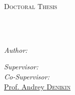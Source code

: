 \documentclass[
12pt, %
oneside, %
english, %
onehalfspacing, %
onehalfspacing, %
headsepline, %
]{MastersDoctoralThesis} %
\author{Bakytzhan \textsc{Urazbekov}} %
\begin{document}
\frontmatter %

\pagestyle{plain} %


\begin{titlepage}
\begin{center}

{\scshape\LARGE \univname\par}\vspace{1.5cm} %
\textsc{\Large Doctoral Thesis}\\[0.5cm] %

\HRule \\[0.4cm] %
{\huge \bfseries \ttitle\par}\vspace{0.4cm} %
\HRule \\[1.5cm] %
 
\begin{minipage}[t]{0.4\textwidth}
\begin{flushleft} \large
\emph{Author:}\\
\href{https://www.researchgate.net/profile/Bakytzhan_Urazbekov}{\authorname} %
\end{flushleft}
\end{minipage}
\begin{minipage}[t]{0.4\textwidth}
\begin{flushright} \large
\emph{Supervisor:} \\
\href{https://www.researchgate.net/profile/Nunzio_Itaco}{\supname} %
\emph{Co-Supervisor:} \\
\href{https://www.researchgate.net/profile/A_Denikin}{Prof. Andrey \textsc{Denikin}} %
\end{flushright}
\end{minipage}
\\[3cm] 

\deptname
\\[1cm] %
 

\end{center}
\end{titlepage}
\end{document}
